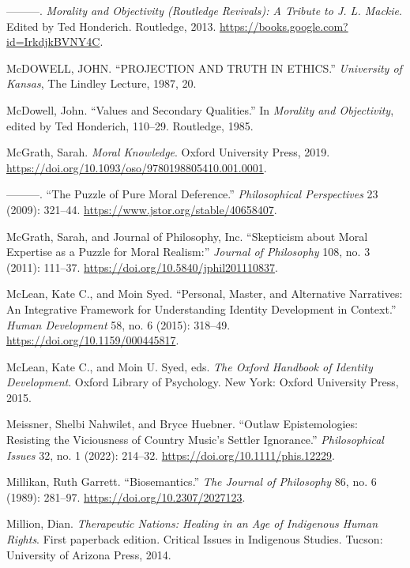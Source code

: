 \documentclass[phdthesis,12pt,final]{wuthesis}
\newlength{\cslhangindent}
\newenvironment{CSLReferences}[2] %
{\begin{list}{}{%
	\setlength{\itemindent}{0pt}
	\setlength{\leftmargin}{0pt}
	\setlength{\parsep}{0pt}
	\ifodd #1
	\setlength{\leftmargin}{\cslhangindent}
	\setlength{\itemindent}{-1\cslhangindent}
	\fi
	\setlength{\itemsep}{#2\baselineskip}}}
{\end{list}}
\theoremstyle{definition}
\theoremstyle{definition}
\theoremstyle{definition}
\theoremstyle{definition}
\theoremstyle{remark}
\begin{document}
\begin{CSLReferences}{1}{0}
---------. \emph{Morality and {Objectivity} ({Routledge Revivals}): {A Tribute} to {J}. {L}. {Mackie}}. Edited by Ted Honderich. Routledge, 2013. \url{https://books.google.com?id=IrkdjkBVNY4C}.

McDOWELL, JOHN. {``{PROJECTION AND TRUTH IN ETHICS}.''} \emph{University of Kansas}, The {Lindley Lecture}, 1987, 20.

McDowell, John. {``Values and {Secondary Qualities}.''} In \emph{Morality and {Objectivity}}, edited by Ted Honderich, 110--29. Routledge, 1985.

McGrath, Sarah. \emph{Moral {Knowledge}}. Oxford University Press, 2019. \url{https://doi.org/10.1093/oso/9780198805410.001.0001}.

---------. {``The {Puzzle} of {Pure Moral Deference}.''} \emph{Philosophical Perspectives} 23 (2009): 321--44. \url{https://www.jstor.org/stable/40658407}.

McGrath, Sarah, and Journal of Philosophy, Inc. {``Skepticism about {Moral Expertise} as a {Puzzle} for {Moral Realism}:''} \emph{Journal of Philosophy} 108, no. 3 (2011): 111--37. \url{https://doi.org/10.5840/jphil201110837}.

McLean, Kate C., and Moin Syed. {``Personal, {Master}, and {Alternative Narratives}: {An Integrative Framework} for {Understanding Identity Development} in {Context}.''} \emph{Human Development} 58, no. 6 (2015): 318--49. \url{https://doi.org/10.1159/000445817}.

McLean, Kate C., and Moin U. Syed, eds. \emph{The {Oxford} Handbook of Identity Development}. Oxford Library of Psychology. New York: Oxford University Press, 2015.

Meissner, Shelbi Nahwilet, and Bryce Huebner. {``Outlaw Epistemologies: {Resisting} the Viciousness of Country Music's Settler Ignorance.''} \emph{Philosophical Issues} 32, no. 1 (2022): 214--32. \url{https://doi.org/10.1111/phis.12229}.

Millikan, Ruth Garrett. {``Biosemantics.''} \emph{The Journal of Philosophy} 86, no. 6 (1989): 281--97. \url{https://doi.org/10.2307/2027123}.

Million, Dian. \emph{Therapeutic {Nations}: {Healing} in an {Age} of {Indigenous Human Rights}}. First paperback edition. Critical {Issues} in {Indigenous Studies}. Tucson: University of Arizona Press, 2014.


\end{CSLReferences}
\end{document}

